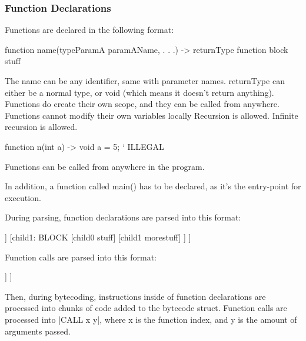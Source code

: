 \documentclass[12pt, letterpaper, oneside]{article}
\begin{document}
	\subsubsection{Function Declarations}
	Functions are declared in the following format:
	\begin{spverbatim}
		function name(typeParamA paramAName, . . .) -> returnType {
			function block stuff
		}
	\end{spverbatim}
	The name can be any identifier, same with parameter names. \newline 
	returnType can either be a normal type, or void (which means it doesn't return anything).
	Functions do create their own scope, and they can be called from anywhere.
	Functions cannot modify their own variables locally
	Recursion is allowed. Infinite recursion is allowed.
	\newpage
	\begin{spverbatim}
		function n(int a) -> void {
			a = 5; ` ILLEGAL
		}
	\end{spverbatim}
	Functions can be called from anywhere in the program.
	
	In addition, a function called main() has to be declared, as it's the entry-point for execution.
	
	During parsing, function declarations are parsed into this format:
	\newline
	\begin{forest}
		[FUNCTIONDECLARATION
		[Left: Name]
		[Right: Returntype]
		[child0: PARAM
		[Left: paramType]
		[right: paramName]
		]
		[child1: BLOCK
		[child0 stuff]
		[child1 morestuff]
		]
		]
	\end{forest}
	Function calls are parsed into this format:
	\newline
	\begin{forest}
		[FUNCCALL
		[Left: Name]
		[Right: NULL]
		[child0: PARAM
		[Left: value]
		]
		]
	\end{forest}
	\newline
	Then, during bytecoding, instructions inside of function declarations are processed into chunks of code added to the bytecode struct.
	Function calls are processed into \spverb|CALL x y|, where x is the function index, and y is the amount of arguments passed.
	
\end{document}
